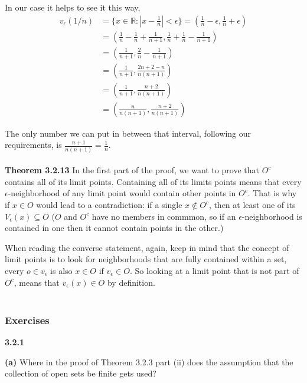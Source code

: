 In our case it helps to see it this way,
\begin{align*}
v_{\epsilon} (1/n) &= \{ x\in\mathbb{R} : \left|x - \frac{1}{n}\right| < \epsilon \} = \left(\frac{1}{n} - \epsilon, \frac{1}{n} + \epsilon \right) \\
&= \left(\frac{1}{n} - \frac{1}{n} + \frac{1}{n+1}, \frac{1}{n} + \frac{1}{n} - \frac{1}{n+1} \right) \\
&= \left(\frac{1}{n+1}, \frac{2}{n} - \frac{1}{n+1} \right) \\
&= \left(\frac{1}{n+1}, \frac{2n + 2 - n}{n(n+1)} \right) \\
&= \left(\frac{1}{n+1}, \frac{n + 2}{n(n+1)} \right) \\
&= \left(\frac{n}{n(n+1)}, \frac{n + 2}{n(n+1)} \right)
\end{align*}

The only number we can put in between that interval, following our requirements, is $\frac{n+1}{n(n+1)} = \frac{1}{n}$.
\\~\\


\textbf{Theorem 3.2.13}
In the first part of the proof, we want to prove that $O^c$ contains all of its limit points.
Containing all of its limits points means that every $\epsilon$-neighborhood of any limit point would
contain other points in $O^c$.
That is why if $x\in O$ would lead to a contradiction: if a single $x \notin O^c$, then at least one of its
$V_\epsilon (x) \subseteq O$ ($O$ and $O^c$ have no members in commmon, so if an $\epsilon$-neighborhood is contained
in one then it cannot contain points in the other.)

When reading the converse statement, again, keep in mind that the concept of limit points is to look for
neighborhoods that are fully contained within a set, every $o \in v_\epsilon $ is also $x \in O$ if
$v_\epsilon \in O$.
So looking at a limit point that is not part of $O^c$, means that $v_{\epsilon} (x) \in O$ by definition.
\\~\\


\subsubsection{Exercises}

\textbf{3.2.1}

\textbf{(a)} Where in the proof of Theorem 3.2.3 part (ii) does the assumption that the collection of
open sets be finite gets used?
\\


